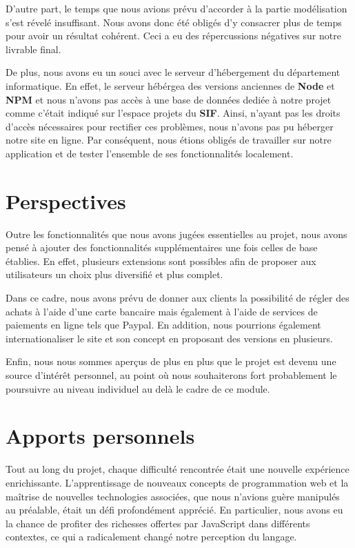 \documentclass[a4paper,12pt]{report}
\theoremstyle{break}
\theoremstyle{break}
\theoremstyle{break}
\theoremstyle{break}
\theoremstyle{definition}
\theoremstyle{remark}
\begin{document}
D'autre part, le temps que nous avions prévu d'accorder à la partie modélisation s'est révelé insuffisant. Nous avons donc été obligés d'y consacrer plus de temps pour avoir un résultat cohérent. Ceci a eu des répercussions négatives sur notre livrable final.

De plus, nous avons eu un souci avec le serveur d'hébergement du département informatique. En effet, le serveur hébérgea des versions anciennes de \textbf{Node} et \textbf{NPM} et nous n'avons pas accès à une base de données dediée à notre projet comme c'était indiqué sur l'espace projets du \textbf{SIF}. Ainsi, n'ayant pas les droits d'accès nécessaires pour rectifier ces problèmes, nous n'avons pas pu héberger notre site en ligne. Par conséquent, nous étions obligés de travailler sur notre application et de tester l'ensemble de ses fonctionnalités localement.
\section{Perspectives}
\label{sec:perspectives}
Outre les fonctionnalités que nous avons jugées essentielles au projet, nous avons pensé à ajouter des fonctionnalités supplémentaires une fois celles de base établies. En effet, plusieurs extensions sont possibles afin de proposer aux utilisateurs un choix plus diversifié et plus complet.

Dans ce cadre, nous avons prévu de donner aux clients la possibilité de régler des achats à l'aide d'une carte bancaire mais également à l'aide de services de paiements en ligne tels que Paypal. En addition, nous pourrions également internationaliser le site et son concept en proposant des versions
en plusieurs.

Enfin, nous nous sommes aperçus de plus en plus que le projet est devenu une source d'intérêt personnel, au point où nous souhaiterons fort probablement le poursuivre au niveau individuel au delà le cadre de ce module.
\section{Apports personnels}
Tout au long du projet, chaque difficulté rencontrée était une nouvelle expérience enrichissante. L'apprentissage de nouveaux concepts de programmation web et la maîtrise de nouvelles technologies associées, que nous n'avions guère manipulés au préalable, était un défi profondément apprécié. En particulier, nous avons eu la chance de profiter des richesses offertes par JavaScript dans différents contextes, ce qui a radicalement changé notre perception du langage.
\end{document}
